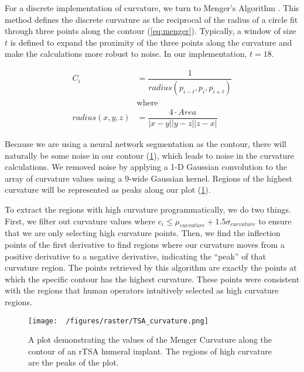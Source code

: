 For a discrete implementation of curvature, we turn to Menger's Algorithm \cite{legerMengerCurvatureRectifiability1999}.
This method defines the discrete curvature as the reciprocal of the radius of a circle fit through three points along the contour (\cref{eq:menger}).
Typically, a window of size $t$ is defined to expand the proximity of the three points along the curvature and make the calculations more robust to noise. In our implementation, $t=18$.

\begin{equation}
  \label{eq:menger}
  \begin{split}
  C_{i} &= \dfrac{1}{radius(p_{i-t},p_{i},p_{i+t})}\\
        &\text{where} \\
        radius(x,y,z) &= \dfrac{4 \cdot Area}{|x-y||y-z||z-x|}
  \end{split}
\end{equation}

Because we are using a neural network segmentation as the contour, there will naturally be some noise in our contour (\cref{fig:tsa-curv}), which leads to noise in the curvature calculations.
We removed noise by applying a 1-D Gaussian convolution to the array of curvature values using a 9-wide Gaussian kernel.
Regions of the highest curvature will be represented as peaks along our plot (\cref{fig:tsa-curv}).

To extract the regions with high curvature programmatically, we do two things.
First, we filter out curvature values where $c_{i} \le \mu_{curvature} + 1.5\sigma_{curvature}$ to ensure that we are only selecting high curvature points.
Then, we find the inflection points of the first derivative to find regions where our curvature moves from a positive derivative to a negative derivative, indicating the ``peak'' of that curvature region.
The points retrieved by this algorithm are exactly the points at which the specific contour has the highest curvature.
These points were consistent with the regions that human operators intuitively selected as high curvature regions.


\begin{figure}[h!]
  \centering
  \texttt{[image: ~/figures/raster/TSA\_curvature.png]}
  \caption{A plot demonstrating the values of the Menger Curvature along the contour of an rTSA humeral implant. The regions of high curvature are the peaks of the plot.}
  \label{fig:tsa-curv}
\end{figure}



